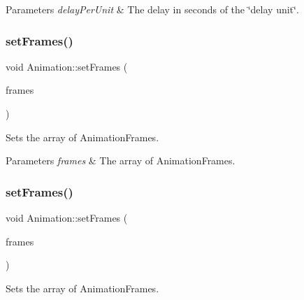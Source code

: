 \begin{DoxyParams}{Parameters}
{\em delay\+Per\+Unit} & The delay in seconds of the \char`\"{}delay unit\char`\"{}. \\
\hline
\end{DoxyParams}
\mbox{\label{classAnimation_a2b083139529c667cc85d961e9ce4e49c}} 
\subsubsection{\texorpdfstring{set\+Frames()}{setFrames()}\hspace{0.1cm}{\footnotesize\ttfamily [1/2]}}
{\footnotesize\ttfamily void Animation\+::set\+Frames (\begin{DoxyParamCaption}\item[{const \hyperlink{classVector}{Vector}$<$ \hyperlink{classAnimationFrame}{Animation\+Frame} $\ast$$>$ \&}]{frames }\end{DoxyParamCaption})\hspace{0.3cm}{\ttfamily [inline]}}

Sets the array of Animation\+Frames.


\begin{DoxyParams}{Parameters}
{\em frames} & The array of Animation\+Frames. \\
\hline
\end{DoxyParams}
\mbox{\label{classAnimation_a2b083139529c667cc85d961e9ce4e49c}} 
\subsubsection{\texorpdfstring{set\+Frames()}{setFrames()}\hspace{0.1cm}{\footnotesize\ttfamily [2/2]}}
{\footnotesize\ttfamily void Animation\+::set\+Frames (\begin{DoxyParamCaption}\item[{const \hyperlink{classVector}{Vector}$<$ \hyperlink{classAnimationFrame}{Animation\+Frame} $\ast$$>$ \&}]{frames }\end{DoxyParamCaption})\hspace{0.3cm}{\ttfamily [inline]}}

Sets the array of Animation\+Frames.


